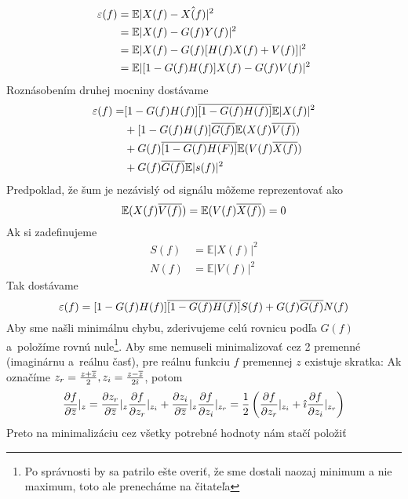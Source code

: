 \def\E{{\mathbb{E}}}
\begin{equation*}
\begin{split}
\eps(f) &= \E | X(f) - \hat{X(f)}|^2 \\
        &= \E | X(f) - G(f) Y(f)| ^2 \\
        &= \E | X(f) - G(f) [ H(f) X(f) +V(f)]|^2 \\
        &= \E | [ 1 - G(f) H(f)] X(f) - G(f) V(f)|^2
\end{split}        
\end{equation*}
Roznásobením druhej mocniny dostávame
\begin{equation*}
\begin{split}
\eps(f) =& [1 - G(f) H(f)]\conjug{[1 - G(f) H(f)]} \E| X(f)|^2 \\
  &+ [1-G(f) H(f)]\conjug{G(f)} \E( X(f) \conjug{V(f)}) \\
  &+ G(f) \conjug{[1-G(f)H(F)]} \E( V(f) \conjug{X(f)}) \\
  &+ G(f) \conjug{G(f)} \E|s(f)|^2
\end{split}
\end{equation*}
Predpoklad, že šum je nezávislý od signálu môžeme reprezentovať ako
\begin{equation*}
 \E( X(f)\conjug{V(f)}) = \E(V(f)\conjug{X(f)}) = 0
\end{equation*}
%
Ak si zadefinujeme
\begin{align*}
 S(f) &= \E| X(f)|^2 \\
 N(f) &= \E| V(f)|^2
\end{align*}
Tak dostávame
\begin{equation*}
\varepsilon(f) = [1-G(f)H(f)]\overline{[1-G(f)H(f)]} S(f)
   + G(f) \overline{G(f)} N(f)
\end{equation*}
Aby sme našli minimálnu chybu, zderivujeme celú rovnicu podľa $G(f)$ 
a~položíme rovnú nule\footnote{Po správnosti by sa patrilo ešte overiť,
že sme dostali naozaj minimum a nie maximum, toto ale prenecháme na
čitateľa}. Aby sme nemuseli minimalizovať cez 2 premenné (imaginárnu 
a~reálnu časť), pre reálnu funkciu $f$ premennej $z$ existuje skratka:
Ak označíme $z_r = \frac{z + \overline{z}}{2}, z_i =
\frac{z-\overline{z}}{2 \hat{\imath}}$, potom
\begin{equation*}
\frac{\partial f}{\partial \overline{z}}|_z = 
  \frac{\partial z_r}{\partial \overline{z}}|_z \frac{\partial f}{\partial z_r}|_{z_i} +
    \frac{\partial z_i}{\partial \overline{z}}|_z \frac{\partial f}{\partial z_i}|_{z_r} =
 \frac{1}{2} \left(
    \frac{\partial f}{\partial z_r}|_{z_i} + \hat{\imath} \frac{\partial f}{\partial z_i}|_{z_r}
    \right)
\end{equation*}
Preto na minimalizáciu cez všetky potrebné hodnoty nám stačí položiť
